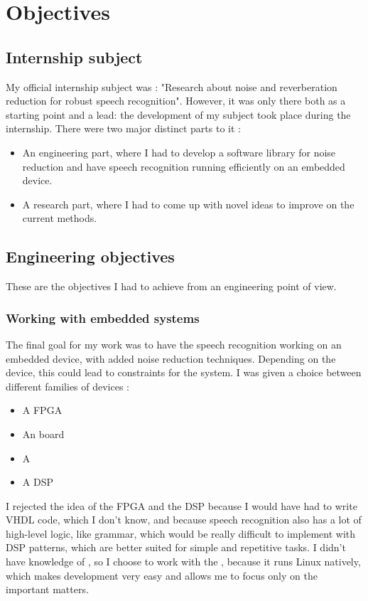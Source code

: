 \section{Objectives}
\subsection{Internship subject}
My official internship subject was : "Research about noise and reverberation reduction for robust speech recognition".
However, it was only there both as a starting point and a lead: the development of my subject took place during the internship.
There were two major distinct parts to it :
\begin{itemize}
\item An engineering part, where I had to develop a software library for noise reduction and have speech recognition running efficiently on an embedded device.
\item A research part, where I had to come up with novel ideas to improve on the current methods.
\end{itemize}


\subsection{Engineering objectives}
These are the objectives I had to achieve from an engineering point of view.
\subsubsection{Working with embedded systems}
The final goal for my work was to have the speech recognition working on an embedded device, with added noise reduction techniques.
Depending on the device, this could lead to constraints for the system.
I was given a choice between different families of devices : 
\begin{itemize}
\item A \ac{FPGA}
\item An  board
\item A 
\item A \ac{DSP}
\end{itemize}
I rejected the idea of the \ac{FPGA} and the \ac{DSP} because I would have had to write \ac{VHDL} code, which I don't know, and because speech recognition also has a lot of high-level logic, like grammar, which would be really difficult to implement with \ac{DSP} patterns, which are better suited for simple and repetitive tasks.
I didn't have knowledge of , so I choose to work with the , because it runs Linux natively, which makes development very easy and allows me to focus only on the important matters.
